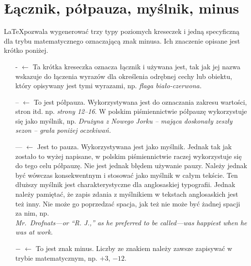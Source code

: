\documentclass[12pt,a4paper,polish]{article}
\begin{document}
\section{Łącznik, półpauza, myślnik, minus}

\LaTeX pozwala wygenerować trzy typy poziomych kreseczek i jedną specyficzną
dla trybu matematycznego oznaczającą znak minusa. Ich znaczenie opisane jest krótko poniżej.

\begin{itemize}
 \item[-]  $\leftarrow$ Ta krótka kreseczka oznacza łącznik i używana jest, tak jak jej nazwa
  wskazuje do łączenia wyrazów dla określenia odrębnej cechy lub obiektu, który
  opisywany jest tymi wyrazami, np. {\em flaga biało-czerwona.}

\item[--] $\leftarrow$ To jest półpauza. Wykorzystywana jest
  do oznaczania zakresu wartości, stron itd. np. {\em strony 12--16}.
  W polskim piśmiennictwie półpauzę wykorzystuje się jako myślnik,
  np.
  {\em Drużyna z Nowego Jorku – mająca doskonały zeszły sezon – grała poniżej oczekiwań.}

\item[---] $\leftarrow$ Jest to pauza. Wykorzystywana jest jako myślnik.
  Jednak tak jak zostało to wyżej napisane, w polskim piśmiennictwie raczej wykorzystuje się
  do tego celu półpauzę. Nie jest jednak błędem używanie pauzy. Należy jednak być wówczas
  konsekwentnym i stosować jako myślnik w całym tekście.
  Ten dłuższy myślnik jest charakterystyczne dla anglosaskiej
  typografii. Jednak należy pamiętać, że zapis zdania z myślnikiem w tekstach anglosaskich jest też inny.
  Nie może go poprzedzać spacja, jak też nie może być żadnej spacji za nim, np.\\
  {\em Mr.~Drofnats---or ``R. J.,'' as he preferred to be called---was happiest when he was at work.}

\item[$-$]  $\leftarrow$ To jest znak minus. Liczby ze znakiem należy zawsze zapisywać
  w trybie matematycznym, np. $+3$, $-12$.
\end{itemize}





\end{document}
